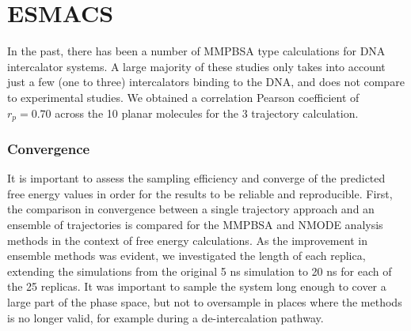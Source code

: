 \section{ESMACS}

In the past, there has been a number of MMPBSA type calculations for DNA intercalator systems. A large majority of these studies only takes into account just a few (one to three) intercalators binding to the DNA, and does not compare to experimental studies. We obtained a correlation Pearson coefficient of $r_p=0.70$ across the 10 planar molecules for the 3 trajectory calculation.

\subsubsection{Convergence}

It is important to assess the sampling efficiency and converge of the predicted free energy values in order for the results to be reliable and reproducible.
First, the comparison in convergence between a single trajectory approach and an ensemble of trajectories is compared for the MMPBSA and NMODE analysis methods in the context of free energy calculations. As the improvement in ensemble methods was evident, we investigated the length of each replica, extending the simulations from the original 5 ns simulation to 20 ns for each of the 25 replicas. It was important to sample the system long enough to cover a large part of the phase space, but not to oversample in places where the methods is no longer valid, for example during a de-intercalation pathway.

